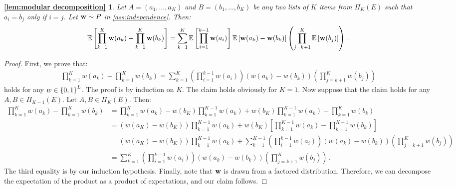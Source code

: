 \newtheorem*{lem:modular decomposition}{\cref{lem:modular decomposition}}
\begin{lem:modular decomposition}
Let $A = (a_1, \dots, a_K)$ and $B = (b_1, \dots, b_K)$ be any two lists of $K$ items from $\Pi_K(E)$ such that $a_i = b_j$ only if $i = j$. Let $\mathbf{w} \sim P$ in \cref{ass:independence}. Then:
\begin{align*}
  \mathbb{E} \left[\prod_{k = 1}^K \mathbf{w}(a_k) - \prod_{k = 1}^K \mathbf{w}(b_k)\right] =
  \sum_{k = 1}^K \mathbb{E} \left[\prod_{i = 1}^{k - 1} \mathbf{w}(a_i)\right]
  \mathbb{E} \left[\mathbf{w}(a_k) - \mathbf{w}(b_k)\right] \left(\prod_{j = k + 1}^K \mathbb{E} \left[\mathbf{w}(b_j)\right]\right)\,.
\end{align*}
\end{lem:modular decomposition}
\begin{proof}
First, we prove that:
\begin{align*}
  \prod_{k = 1}^K w(a_k) - \prod_{k = 1}^K w(b_k) =
  \sum_{k = 1}^K \left(\prod_{i = 1}^{k - 1} w(a_i)\right) (w(a_k) - w(b_k)) \left(\prod_{j = k + 1}^K w(b_j)\right)
\end{align*}
holds for any $w \in \left\{0, 1\right\}^L$. The proof is by induction on $K$. The claim holds obviously for $K = 1$. Now suppose that the claim holds for any $A, B \in \Pi_{K - 1}(E)$. Let $A, B \in \Pi_K(E)$. Then:
\begin{align*}
  \prod_{k = 1}^K w(a_k) - \prod_{k = 1}^K w(b_k)
  & = \prod_{k = 1}^K w(a_k) - w(b_K) \prod_{k = 1}^{K - 1} w(a_k) +
  w(b_K) \prod_{k = 1}^{K - 1} w(a_k) - \prod_{k = 1}^K w(b_k) \\
  & = (w(a_K) - w(b_K)) \prod_{k = 1}^{K - 1} w(a_k) +
  w(b_K) \left[\prod_{k = 1}^{K - 1} w(a_k) - \prod_{k = 1}^{K - 1} w(b_k)\right] \\
  & = (w(a_K) - w(b_K)) \prod_{k = 1}^{K - 1} w(a_k) +
  \sum_{k = 1}^{K - 1} \left(\prod_{i = 1}^{k - 1} w(a_i)\right)
  (w(a_k) - w(b_k)) \left(\prod_{j = k + 1}^K w(b_j)\right) \\
  & = \sum_{k = 1}^K \left(\prod_{i = 1}^{k - 1} w(a_i)\right)
  (w(a_k) - w(b_k)) \left(\prod_{j = k + 1}^K w(b_j)\right)\,.
\end{align*}
The third equality is by our induction hypothesis. Finally, note that $\mathbf{w}$ is drawn from a factored distribution. Therefore, we can decompose the expectation of the product as a product of expectations, and our claim follows.
\end{proof}

